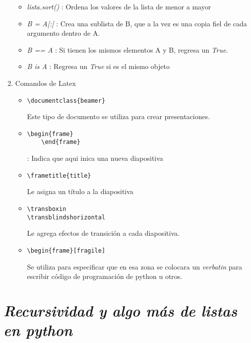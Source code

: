 \documentclass{book}
\begin{document}
\begin{enumerate}
\begin{itemize}
		\item \textit{lista.sort()} : Ordena los valores de la lista de menor a mayor
		\item \textit{B = A[:]} : Crea una sublista de B, que a la vez es una copia fiel de cada argumento dentro de A.
		\item \textit{B == A} : Si tienen los mismos elementos A y B, regresa un \textit{True}.
		\item \textit{B is A} : Regresa un \textit{True} si es el mismo objeto
		
	\end{itemize}
	
	
	\item Comandos de Latex
	\begin{itemize}
		\item \begin{lstlisting}
\documentclass{beamer}
		\end{lstlisting} Este tipo de documento se utiliza para crear presentaciones.
		\item \begin{lstlisting}
\begin{frame}
    \end{frame}
		\end{lstlisting} : Indica que aqui inica una nueva diapositiva
		\item \begin{lstlisting}
\frametitle{title}
		\end{lstlisting} Le asigna un título a la diapositiva
		\item \begin{lstlisting}
\transboxin
\transblindshorizontal
		\end{lstlisting} Le agrega efectos de transición a cada diapositiva.
		\item \begin{lstlisting}
\begin{frame}[fragile]
		\end{lstlisting} Se utiliza para especificar que en esa zona se colocara un \textit{verbatin} para escribir código de programación de python u otros.
		
		
		
	\end{itemize}
	
\end{enumerate}



	\section{\textit{Recursividad y algo más de listas en python }}
	
\end{document}
